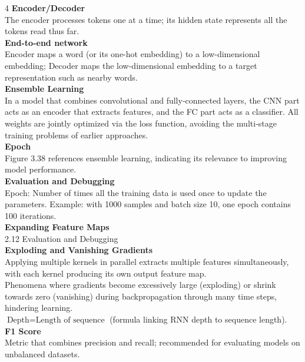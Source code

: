 \documentclass[8pt]{extarticle}
\begin{document}
\begin{multicols}{4}
\vspace{2pt}\textbf{Encoder/Decoder}\\
The encoder processes tokens one at a time; its hidden state represents all the tokens read thus far.\\
\vspace{2pt}\textbf{End-to-end network}\\
Encoder maps a word (or its one-hot embedding) to a low-dimensional embedding; Decoder maps the low-dimensional embedding to a target representation such as nearby words.\\
\vspace{2pt}\textbf{Ensemble Learning}\\
In a model that combines convolutional and fully‑connected layers, the CNN part acts as an encoder that extracts features, and the FC part acts as a classifier. All weights are jointly optimized via the loss function, avoiding the multi‑stage training problems of earlier approaches.\\
\vspace{2pt}\textbf{Epoch}\\
Figure 3.38 references ensemble learning, indicating its relevance to improving model performance.\\
\vspace{2pt}\textbf{Evaluation and Debugging}\\
Epoch: Number of times all the training data is used once to update the parameters. Example: with 1000 samples and batch size 10, one epoch contains 100 iterations.\\
\vspace{2pt}\textbf{Expanding Feature Maps}\\
2.12 Evaluation and Debugging\\
\vspace{2pt}\textbf{Exploding and Vanishing Gradients}\\
Applying multiple kernels in parallel extracts multiple features simultaneously, with each kernel producing its own output feature map.\\
Phenomena where gradients become excessively large (exploding) or shrink towards zero (vanishing) during backpropagation through many time steps, hindering learning.\\
$ \text{Depth} = \text{Length of sequence} $ (formula linking RNN depth to sequence length).\\
\vspace{2pt}\textbf{F1 Score}\\
Metric that combines precision and recall; recommended for evaluating models on unbalanced datasets.\\

\end{multicols}
\end{document}
